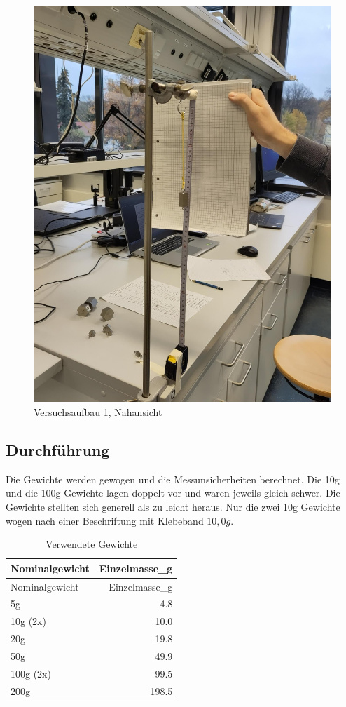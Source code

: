 \documentclass[
  9pt,
]{article}
\begin{document}
\begin{figure}
\centering
\includegraphics[width=\textwidth,height=0.2\textheight]{Bilder/V2B2.jpeg}
\caption{Versuchsaufbau 1, Nahansicht}
\end{figure}

\hypertarget{durchfuxfchrung}{%
\subsection{Durchführung}\label{durchfuxfchrung}}

Die Gewichte werden gewogen und die Messunsicherheiten berechnet. Die
10g und die 100g Gewichte lagen doppelt vor und waren jeweils gleich
schwer. Die Gewichte stellten sich generell als zu leicht heraus. Nur
die zwei 10g Gewichte wogen nach einer Beschriftung mit Klebeband
\(10,0g\).

\begin{longtable}[]{@{}lr@{}}
\caption{Verwendete Gewichte}\tabularnewline
\toprule()
Nominalgewicht & Einzelmasse\_g \\
\midrule()
\endfirsthead
\toprule()
Nominalgewicht & Einzelmasse\_g \\
\midrule()
\endhead
5g & 4.8 \\
10g (2x) & 10.0 \\
20g & 19.8 \\
50g & 49.9 \\
100g (2x) & 99.5 \\
200g & 198.5 \\
\bottomrule()
\end{longtable}
\end{document}
